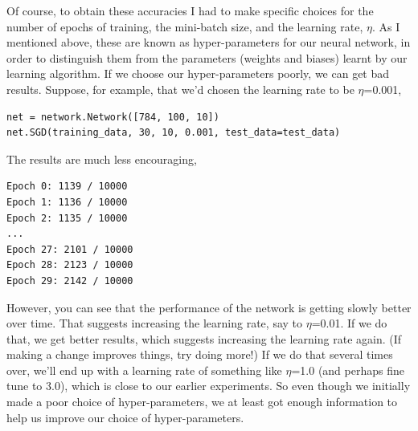 Of course, to obtain these accuracies I had to make specific choices for the number of epochs of training, the mini-batch size, and the learning rate, $\eta$. As I mentioned above, these are known as hyper-parameters for our neural network, in order to distinguish them from the parameters (weights and biases) learnt by our learning algorithm. If we choose our hyper-parameters poorly, we can get bad results. Suppose, for example, that we'd chosen the learning rate to be $\eta$=0.001,
\begin{lstlisting}
net = network.Network([784, 100, 10])
net.SGD(training_data, 30, 10, 0.001, test_data=test_data)
\end{lstlisting}
The results are much less encouraging,
\begin{lstlisting}
Epoch 0: 1139 / 10000
Epoch 1: 1136 / 10000
Epoch 2: 1135 / 10000
...
Epoch 27: 2101 / 10000
Epoch 28: 2123 / 10000
Epoch 29: 2142 / 10000
\end{lstlisting}
However, you can see that the performance of the network is getting slowly better over time. That suggests increasing the learning rate, say to $\eta$=0.01. If we do that, we get better results, which suggests increasing the learning rate again. (If making a change improves things, try doing more!) If we do that several times over, we'll end up with a learning rate of something like $\eta$=1.0 (and perhaps fine tune to 3.0), which is close to our earlier experiments. So even though we initially made a poor choice of hyper-parameters, we at least got enough information to help us improve our choice of hyper-parameters.


